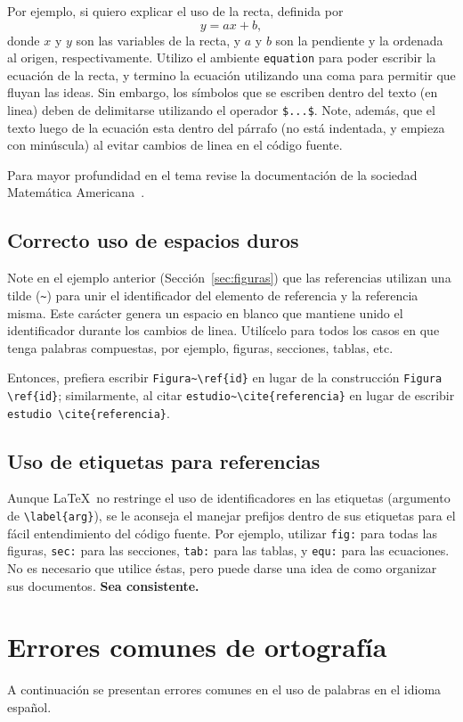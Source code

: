 \documentclass[twocolumn,11pts]{IEEEtran}
\begin{document}
Por ejemplo, si quiero explicar el uso de la recta, definida por
\begin{equation}
y = ax + b,
\end{equation}
donde $x$ y $y$ son las variables de la recta, y $a$ y $b$ son la pendiente y la ordenada al origen, respectivamente. Utilizo el ambiente \verb|equation| para poder escribir la ecuación de la recta, y termino la ecuación utilizando una coma para permitir que fluyan las ideas. Sin embargo, los símbolos que se escriben dentro del texto (en linea) deben de delimitarse utilizando el operador \verb|$...$|. Note, además, que el texto luego de la ecuación esta dentro del párrafo (no está indentada, y empieza con minúscula) al evitar cambios de linea en el código fuente.

Para mayor profundidad en el tema revise la documentación de la sociedad Matemática Americana~\cite{Downes2002}.

\subsection{Correcto uso de espacios duros}
Note en el ejemplo anterior (Sección~\ref{sec:figuras}) que las referencias utilizan una tilde (\verb|~|) para unir el identificador del elemento de referencia y la referencia misma. Este carácter genera un espacio en blanco que mantiene unido el identificador durante los cambios de linea. Utilícelo para todos los casos en que tenga palabras compuestas, por ejemplo, figuras, secciones, tablas, etc.

Entonces, prefiera escribir \verb|Figura~\ref{id}| en lugar de la construcción \verb|Figura \ref{id}|; similarmente, al citar \verb|estudio~\cite{referencia}| en lugar de escribir \verb|estudio \cite{referencia}|.

\subsection{Uso de etiquetas para referencias}
Aunque \LaTeX\ no restringe el uso de identificadores en las etiquetas (argumento de \verb|\label{arg}|), se le aconseja el manejar prefijos dentro de sus etiquetas para el fácil entendimiento del código fuente. Por ejemplo, utilizar \texttt{fig:} para todas las figuras, \texttt{sec:} para las secciones, \texttt{tab:} para las tablas, y \texttt{equ:} para las ecuaciones. No es necesario que utilice éstas, pero puede darse una idea de como organizar sus documentos. \textbf{Sea consistente.}

\section{Errores comunes de ortografía}
A continuación se presentan errores comunes en el uso de palabras en el idioma español.
\end{document}
